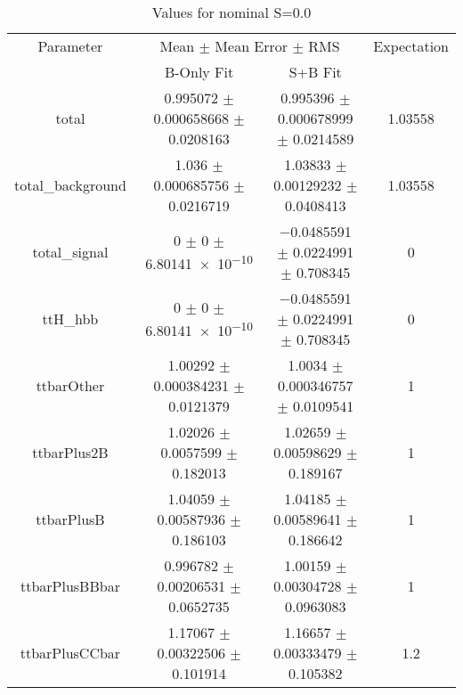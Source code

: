 \begin{table}
\centering
\caption{Values for nominal S=0.0}
\begin{tabular}{cccc}
\toprule
Parameter & \multicolumn{2}{c}{Mean $\pm$ Mean Error $\pm$ RMS} & Expectation\\
 & B-Only Fit & S+B Fit & \\
\midrule
total & \num{0.995072} $\pm$ \num{0.000658668} $\pm$ \num{0.0208163} & \num{0.995396} $\pm$ \num{0.000678999} $\pm$ \num{0.0214589} & \num{1.03558}\\
total\_background & \num{1.036} $\pm$ \num{0.000685756} $\pm$ \num{0.0216719} & \num{1.03833} $\pm$ \num{0.00129232} $\pm$ \num{0.0408413} & \num{1.03558}\\
total\_signal & \num{0} $\pm$ \num{0} $\pm$ \num{6.80141e-10} & \num{-0.0485591} $\pm$ \num{0.0224991} $\pm$ \num{0.708345} & \num{0}\\
ttH\_hbb & \num{0} $\pm$ \num{0} $\pm$ \num{6.80141e-10} & \num{-0.0485591} $\pm$ \num{0.0224991} $\pm$ \num{0.708345} & \num{0}\\
ttbarOther & \num{1.00292} $\pm$ \num{0.000384231} $\pm$ \num{0.0121379} & \num{1.0034} $\pm$ \num{0.000346757} $\pm$ \num{0.0109541} & \num{1}\\
ttbarPlus2B & \num{1.02026} $\pm$ \num{0.0057599} $\pm$ \num{0.182013} & \num{1.02659} $\pm$ \num{0.00598629} $\pm$ \num{0.189167} & \num{1}\\
ttbarPlusB & \num{1.04059} $\pm$ \num{0.00587936} $\pm$ \num{0.186103} & \num{1.04185} $\pm$ \num{0.00589641} $\pm$ \num{0.186642} & \num{1}\\
ttbarPlusBBbar & \num{0.996782} $\pm$ \num{0.00206531} $\pm$ \num{0.0652735} & \num{1.00159} $\pm$ \num{0.00304728} $\pm$ \num{0.0963083} & \num{1}\\
ttbarPlusCCbar & \num{1.17067} $\pm$ \num{0.00322506} $\pm$ \num{0.101914} & \num{1.16657} $\pm$ \num{0.00333479} $\pm$ \num{0.105382} & \num{1.2}\\
\bottomrule
\end{tabular}
\end{table}